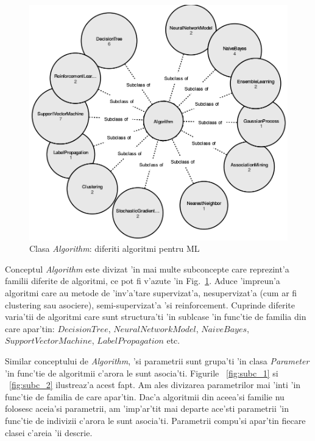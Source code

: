 \documentclass[12pt,a4paper,twoside]{report}
\begin{document}
\begin{figure}[h!]
    \centering
    \includegraphics[width = 0.75 \linewidth]{img/algorithm_subclasses.png}
        \caption{Clasa {\it Algorithm}: diferiti algoritmi pentru ML}
    \label{fig:alg_sucls}
\end{figure}

Conceptul {\it Algorithm} este divizat 'in mai multe subconcepte care reprezint'a familii diferite de algoritmi, ce pot fi v'azute 'in Fig.~\ref{fig:alg_sucls}. Aduce 'impreun'a algoritmi care au metode de 'inv'a'tare supervizat'a, nesupervizat'a (cum ar fi clustering sau asociere), semi-supervizat'a 'si reinforcement. Cuprinde diferite varia'tii de algoritmi care sunt structura'ti 'in sublcase 'in func'tie de familia din care apar'tin: $DecisionTree$, $NeuralNetworkModel$, $NaiveBayes$, $SupportVectorMachine$, $LabelPropagation$ etc.

Similar conceptului de {\it Algorithm}, 'si parametrii sunt grupa'ti 'in clasa {\it Parameter} 'in func'tie de algoritmii c'arora le sunt asocia'ti. Figurile ~\ref{fig:subc_1} si ~\ref{fig:subc_2} ilustreaz'a acest fapt. Am ales divizarea parametrilor mai 'int\ia i 'in func'tie de familia de care apar'tin. Dac'a algoritmii din aceea'si familie nu folosesc aceia'si parametrii, am 'imp'ar'tit mai departe ace'sti parametrii 'in func'tie de indivizii c'arora le sunt asocia'ti. Parametrii compu'si apar'tin fiecare clasei c'areia 'ii descrie. 
\end{document}
